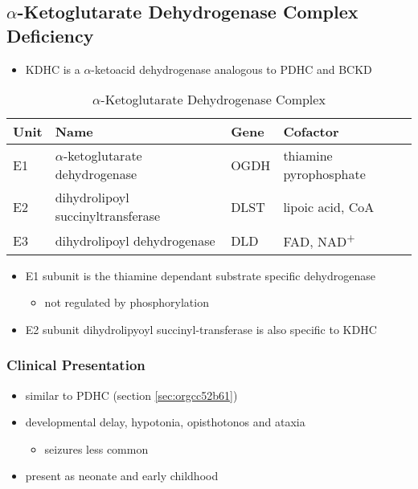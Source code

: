 \documentclass[12pt]{scrartcl}
\begin{document}
\subsection{\(\alpha\)-Ketoglutarate Dehydrogenase Complex Deficiency}
\label{sec:org6c02e78}
\begin{itemize}
\item KDHC is a \(\alpha\)-ketoacid dehydrogenase analogous to PDHC and BCKD
\end{itemize}


\begin{table}[htbp]
\caption{\label{tab:orgc8b5164}\(\alpha\)-Ketoglutarate Dehydrogenase Complex}
\centering
\begin{tabular}{llll}
Unit & Name & Gene & Cofactor\\
\hline
E1 & \(\alpha\)-ketoglutarate dehydrogenase & OGDH & thiamine pyrophosphate\\
E2 & dihydrolipoyl succinyltransferase & DLST & lipoic acid, CoA\\
E3 & dihydrolipoyl dehydrogenase & DLD & FAD, NAD\textsuperscript{+}\\
\end{tabular}
\end{table}

\begin{itemize}
\item E1 subunit is the thiamine dependant substrate specific dehydrogenase
\begin{itemize}
\item not regulated by phosphorylation
\end{itemize}
\item E2 subunit dihydrolipyoyl succinyl-transferase is also specific to KDHC
\end{itemize}

\subsubsection{Clinical Presentation}
\label{sec:org021ece8}
\begin{itemize}
\item similar to PDHC (section \ref{sec:orgcc52b61})
\item developmental delay, hypotonia, opisthotonos and ataxia
\begin{itemize}
\item seizures less common
\end{itemize}
\item present as neonate and early childhood
\end{itemize}
\end{document}

